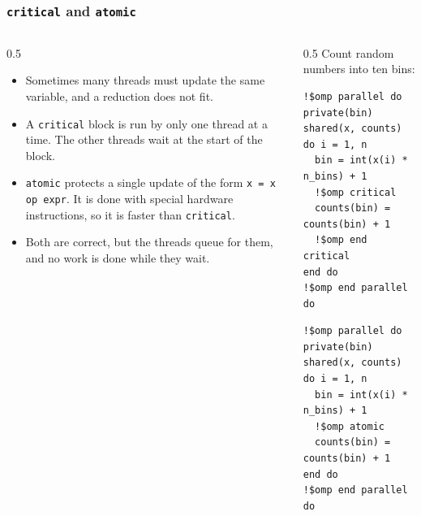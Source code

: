 \begin{frame}[fragile]
  \frametitle{\texttt{critical} and \texttt{atomic}}
  \begin{columns}[T]
    \begin{column}{0.5\textwidth}
      \begin{itemize}
        \item Sometimes many threads must update the same variable, and a reduction does not fit.
        \item A \texttt{critical} block is run by only one thread at a time. The other threads wait at the start of the block.
        \item \texttt{atomic} protects a single update of the form \texttt{x = x op expr}. It is done with special hardware instructions, so it is faster than \texttt{critical}.
        \item Both are correct, but the threads queue for them, and no work is done while they wait.
      \end{itemize}
    \end{column}

    \begin{column}{0.5\textwidth}
      Count random numbers into ten bins:
      \begin{lstlisting}
!$omp parallel do private(bin) shared(x, counts)
do i = 1, n
  bin = int(x(i) * n_bins) + 1
  !$omp critical
  counts(bin) = counts(bin) + 1
  !$omp end critical
end do
!$omp end parallel do
      \end{lstlisting}

      \vspace*{1mm}
      \begin{lstlisting}
!$omp parallel do private(bin) shared(x, counts)
do i = 1, n
  bin = int(x(i) * n_bins) + 1
  !$omp atomic
  counts(bin) = counts(bin) + 1
end do
!$omp end parallel do
      \end{lstlisting}
    \end{column}
  \end{columns}
\end{frame}


